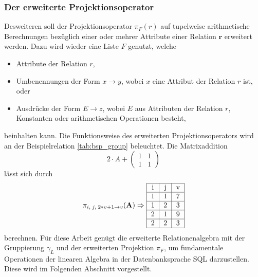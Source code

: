 \subsubsection*{Der erweiterte Projektionsoperator}
Desweiteren soll der Projektionsoperator $\pi_F(r)$ auf tupelweise arithmetische Berechnungen bezüglich einer oder mehrer Attribute einer Relation $\mathbf{r}$ erweitert werden. Dazu wird wieder eine Liste $F$ genutzt, welche 
\begin{itemize}
    \item Attribute der Relation $r$,
    \item Umbenennungen der Form $x \rightarrow y$, wobei $x$ eine Attribut der Relation $r$ ist, oder
    \item Ausdrücke der Form $E \rightarrow z$, wobei $E$ aus Attributen der Relation $r$, Konstanten oder arithmetischen Operationen besteht,
\end{itemize}
beinhalten kann. Die Funktionsweise des erweiterten Projektionsoperators wird an der Beispielrelation \ref{tab:bsp_group} beleuchtet. Die Matrixaddition
\begin{equation*}
    2 \cdot A + \begin{pmatrix}
        1 & 1\\
        1 &1
    \end{pmatrix}
\end{equation*}
lässt sich durch
\begin{equation*}
    \pi_{i,\; j, \; 2*v+1 \rightarrow v}(\mathbf{A}) \Rightarrow
    \begin{tabular}{|c|c|c|} \hline
        i &j &v\\
        \hline
        1 &1 &7\\
        \hline
        1 &2 &3\\
        \hline
        2 &1 &9\\
        \hline
        2 &2 &3\\
        \hline
    \end{tabular}
\end{equation*}
berechnen. Für diese Arbeit genügt die erweiterte Relationenalgebra mit der Gruppierung $\gamma_L$ und der erweiterten Projektion $\pi_F$, um fundamentale Operationen der linearen Algebra in der Datenbanksprache SQL darzustellen. Diese wird im Folgenden Abschnitt vorgestellt.
